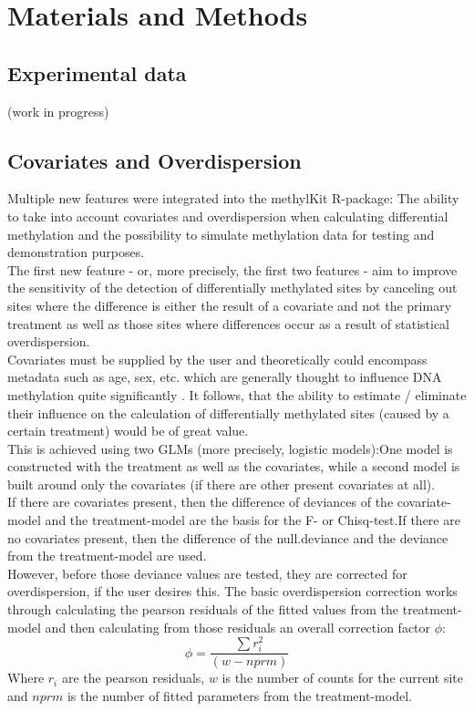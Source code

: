 \section{Materials and Methods}
\subsection{Experimental data}

(work in progress)

\subsection{Covariates and Overdispersion}

Multiple new features were integrated into the methylKit R-package: The ability to take into account covariates and overdispersion when calculating differential methylation and the possibility to simulate methylation data for testing and demonstration purposes.\\
The first new feature - or, more precisely, the first two features - aim to  improve the sensitivity of the detection of differentially methylated sites by canceling out sites where the difference is either the result of a covariate and not the primary treatment as well as those sites where differences occur as a result of statistical overdispersion.\\
Covariates must be supplied by the user and theoretically could encompass metadata such as age, sex, etc. which are generally thought to influence DNA methylation quite significantly \cite{24561809}. It follows, that the ability to estimate / eliminate their influence on the calculation of differentially methylated sites (caused by a certain treatment) would be of great value.\\
This is achieved using two GLMs (more precisely, logistic models):One model is constructed with the treatment as well as the covariates, while a second model is built around only the covariates (if there are other present covariates at all).\\
If there are covariates present, then the difference of deviances of the covariate-model and the treatment-model are the basis for the F- or Chisq-test.If there are no covariates present, then the difference of the null.deviance and the deviance from the treatment-model are used.\\
However, before those deviance values are tested, they are corrected for overdispersion, if the user desires this. The basic overdispersion correction works through calculating the pearson residuals of the fitted values from the treatment-model and then calculating from those residuals an overall correction factor $\phi$:
\[\phi = \frac{\sum{r_{i}^2}}{(w - nprm)}\]
Where $r_{i}$ are the pearson residuals, $w$ is the number of counts for the current site and $nprm$ is the number of fitted parameters from the treatment-model.

